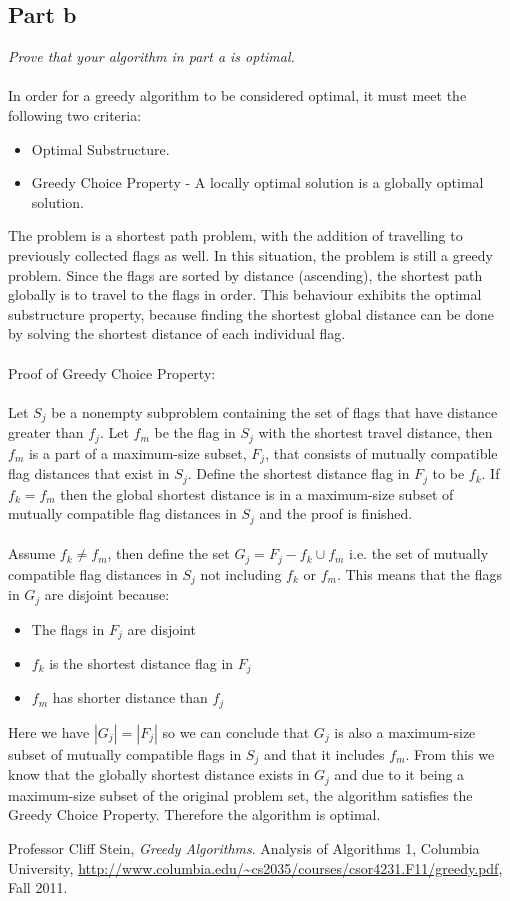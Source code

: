 \documentclass{article}
\begin{document}
\subsection{Part b}
{\em Prove that your algorithm in part a is optimal.}\\
\\
In order for a greedy algorithm to be considered optimal, it must meet the following two criteria:
\begin{itemize}
\item Optimal Substructure.
\item Greedy Choice Property - A locally optimal solution is a globally optimal solution.
\end{itemize}
The problem is a shortest path problem, with the addition of travelling to previously collected flags as well. In this situation, the problem is still a greedy problem. Since the flags are sorted by distance (ascending), the shortest path globally is to travel to the flags in order. This behaviour exhibits the optimal substructure property, because finding the shortest global distance can be done by solving the shortest distance of each individual flag.\\
\\
Proof of Greedy Choice Property:\\
\\
Let $S_j$ be a nonempty subproblem containing the set of flags that have distance greater than $f_j$. Let $f_m$ be the flag in $S_j$ with the shortest travel distance, then $f_m$ is a part of a maximum-size subset, $F_j$, that consists of mutually compatible flag distances that exist in $S_j$. Define the shortest distance flag in $F_j$ to be $f_k$. If $f_k = f_m$ then the global shortest distance is in a maximum-size subset of mutually compatible flag distances in $S_j$ and the proof is finished.\\
\\
Assume ${f_k \neq f_m}$, then define the set ${G_j = F_j - f_k \cup f_m }$ i.e. the set of mutually compatible flag distances in $S_j$ not including $f_k$ or $f_m$. This means that the flags in $G_j$ are disjoint because:
\begin{itemize}
\item The flags in $F_j$ are disjoint
\item $f_k$ is the shortest distance flag in $F_j$
\item $f_m$ has shorter distance than $f_j$
\end{itemize}
Here we have $|G_j| = |F_j|$ so we can conclude that $G_j$ is also a maximum-size subset of mutually compatible flags in $S_j$ and that it includes $f_m$. From this we know that the globally shortest distance exists in $G_j$ and due to it being a maximum-size subset of the original problem set, the algorithm satisfies the Greedy Choice Property. Therefore the algorithm is optimal.
\begin{thebibliography}{9}
    Professor Cliff Stein,
    \emph{Greedy Algorithms}.
    Analysis of Algorithms 1, Columbia University,
    \url{http://www.columbia.edu/~cs2035/courses/csor4231.F11/greedy.pdf},
    Fall 2011.
\end{thebibliography}
\end{document}
